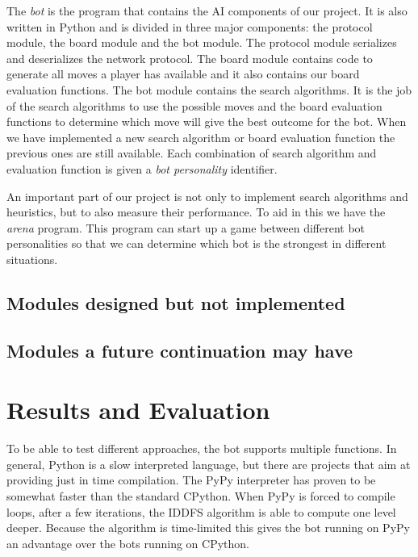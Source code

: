 \documentclass[a4paper,11pt]{article}
\begin{document}
The \emph{bot} is the program that contains the AI components of our
project. It is also written in Python and is divided in three major
components: the protocol module, the board module and the bot module.
The protocol module serializes and deserializes the network protocol.
The board module contains code to generate all moves a player has
available and it also contains our board evaluation functions. The bot
module contains the search algorithms. It is the job of the search
algorithms to use the possible moves and the board evaluation
functions to determine which move will give the best outcome for the
bot. When we have implemented a new search algorithm or board
evaluation function the previous ones are still available. Each
combination of search algorithm and evaluation function is given a
\emph{bot personality} identifier.

An important part of our project is not only to implement search
algorithms and heuristics, but to also measure their performance. To
aid in this we have the \emph{arena} program. This program can start
up a game between different bot personalities so that we can determine
which bot is the strongest in different situations.

\subsection{Modules designed but not implemented}

\subsection{Modules a future continuation may have}

\section{Results and Evaluation}

To be able to test different approaches, the bot supports multiple
functions. In general, Python is a slow interpreted language, but
there are projects that aim at providing just in time compilation. The
PyPy interpreter has proven to be somewhat faster than the standard
CPython. When PyPy is forced to compile loops, after a few iterations,
the IDDFS algorithm is able to compute one level deeper. Because the
algorithm is time-limited this gives the bot running on PyPy an
advantage over the bots running on CPython.
\end{document}
